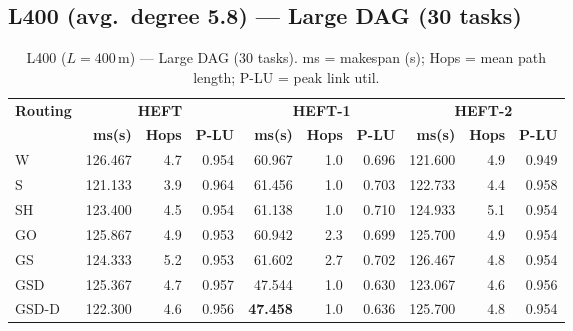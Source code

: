 \documentclass[11pt]{article}
\newcommand{\win}[1]{\textcolor{green!50!black}{\textbf{#1}}}
\newcommand{\bad}[1]{\textcolor{red!70!black}{#1}}
\begin{document}
\subsection{L400 (avg.\ degree 5.8) --- Large DAG (30 tasks)}
\begin{table}[H]
\centering\small
\begin{tabular}{l r r r r r r r r r}
\toprule
\textbf{Routing} & \multicolumn{3}{c}{\textbf{HEFT}} & \multicolumn{3}{c}{\textbf{HEFT-1}} & \multicolumn{3}{c}{\textbf{HEFT-2}} \\
\cmidrule(lr){2-4}\cmidrule(lr){5-7}\cmidrule(lr){8-10}
& \textbf{ms(s)} & \textbf{Hops} & \textbf{P-LU} & \textbf{ms(s)} & \textbf{Hops} & \textbf{P-LU} & \textbf{ms(s)} & \textbf{Hops} & \textbf{P-LU} \\
\midrule
  W & \bad{126.467} & 4.7 & 0.954 & 60.967 & 1.0 & 0.696 & 121.600 & 4.9 & 0.949 \\
  S & 121.133 & 3.9 & 0.964 & 61.456 & 1.0 & 0.703 & 122.733 & 4.4 & 0.958 \\
  SH & 123.400 & 4.5 & 0.954 & 61.138 & 1.0 & 0.710 & 124.933 & 5.1 & 0.954 \\
  GO & 125.867 & 4.9 & 0.953 & 60.942 & 2.3 & 0.699 & 125.700 & 4.9 & 0.954 \\
  GS & 124.333 & 5.2 & 0.953 & \bad{61.602} & 2.7 & 0.702 & \bad{126.467} & 4.8 & 0.954 \\
  GSD & 125.367 & 4.7 & 0.957 & 47.544 & 1.0 & 0.630 & 123.067 & 4.6 & 0.956 \\
  GSD-D & 122.300 & 4.6 & 0.956 & \win{47.458} & 1.0 & 0.636 & 125.700 & 4.8 & 0.954 \\
\bottomrule
\end{tabular}
\caption{L400 ($L=400$\,m) --- Large DAG (30 tasks). ms = makespan (s); Hops = mean path length; P-LU = peak link util.}
\end{table}
\end{document}
